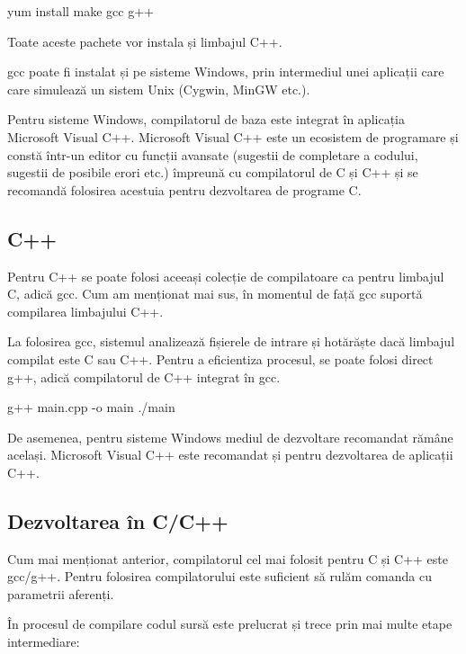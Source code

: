 \begin{screen}
yum install make gcc g++
\end{screen}

Toate aceste pachete vor instala și limbajul C++.

gcc poate fi instalat și pe sisteme Windows, prin intermediul unei aplicații
care care simulează un sistem Unix (Cygwin, MinGW etc.).

Pentru sisteme Windows, compilatorul de baza este integrat în aplicația
Microsoft Visual C++. Microsoft Visual C++ este un ecosistem de programare și
constă într-un editor cu funcții avansate (sugestii de completare a codului,
sugestii de posibile erori etc.) împreună cu compilatorul de C și C++ și se
recomandă folosirea acestuia pentru dezvoltarea de programe C.

\subsection{C++}
\label{sec:appdev-ideinstall-cpp}

Pentru C++ se poate folosi aceeași colecție de compilatoare ca pentru limbajul
C, adică gcc. Cum am menționat mai sus, în momentul de față gcc suportă
compilarea limbajului C++.

La folosirea gcc, sistemul analizează fișierele de intrare și hotărăște dacă
limbajul compilat este C sau C++. Pentru a eficientiza procesul, se poate folosi
direct g++, adică compilatorul de C++ integrat în gcc.

\begin{screen}[caption={Exemplu compilare si rulare C++}]
g++ main.cpp -o main
./main
\end{screen}

De asemenea, pentru sisteme Windows mediul de dezvoltare recomandat rămâne
același. Microsoft Visual C++ este recomandat și pentru dezvoltarea de aplicații
C++.

\subsection{Dezvoltarea în C/C++}
\label{sec:appdev-ideinstall-c-dev}

Cum mai menționat anterior, compilatorul cel mai folosit pentru C și C++ este
gcc/g++. Pentru folosirea compilatorului este suficient să rulăm comanda
 cu parametrii aferenți.

În procesul de compilare codul sursă este prelucrat și trece prin mai multe
etape intermediare:

